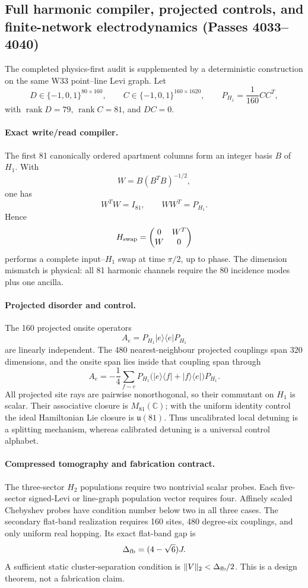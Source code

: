 \subsection{Full harmonic compiler, projected controls, and finite-network electrodynamics (Passes 4033--4040)}
\label{sec:pass4033-4040-physics-continuation}

The completed physics-first audit is supplemented by a deterministic construction on the same W33 point--line Levi graph.  Let
\[
D\in\{-1,0,1\}^{80\times160},\qquad
C\in\{-1,0,1\}^{160\times1620},\qquad
P_{H_1}=\frac1{160}CC^T,
\]
with \(\operatorname{rank}D=79\), \(\operatorname{rank}C=81\), and \(DC=0\).

\paragraph{Exact write/read compiler.}
The first 81 canonically ordered apartment columns form an integer basis \(B\) of \(H_1\).  With
\[
W=B(B^TB)^{-1/2},
\]
one has
\[
W^TW=I_{81},\qquad WW^T=P_{H_1}.
\]
Hence
\[
H_{\rm swap}=\begin{pmatrix}0&W^T\\W&0\end{pmatrix}
\]
performs a complete input--\(H_1\) swap at time \(\pi/2\), up to phase.  The dimension mismatch is physical: all 81 harmonic channels require the 80 incidence modes plus one ancilla.

\paragraph{Projected disorder and control.}
The 160 projected onsite operators
\[
A_e=P_{H_1}|e\rangle\!\langle e|P_{H_1}
\]
are linearly independent.  The 480 nearest-neighbour projected couplings span 320 dimensions, and the onsite span lies inside that coupling span through
\[
A_e=-\frac14\sum_{f\sim e}P_{H_1}
\bigl(|e\rangle\!\langle f|+|f\rangle\!\langle e|\bigr)P_{H_1}.
\]
All projected site rays are pairwise nonorthogonal, so their commutant on \(H_1\) is scalar.  Their associative closure is \(M_{81}(\mathbb C)\); with the uniform identity control the ideal Hamiltonian Lie closure is \(\mathfrak u(81)\).  Thus uncalibrated local detuning is a splitting mechanism, whereas calibrated detuning is a universal control alphabet.

\paragraph{Compressed tomography and fabrication contract.}
The three-sector \(H_2\) populations require two nontrivial scalar probes.  Each five-sector signed-Levi or line-graph population vector requires four.  Affinely scaled Chebyshev probes have condition number below two in all three cases.  The secondary flat-band realization requires 160 sites, 480 degree-six couplings, and only uniform real hopping.  Its exact flat-band gap is
\[
\Delta_{\rm fb}=(4-\sqrt6)J.
\]
A sufficient static cluster-separation condition is \(\|V\|_2<\Delta_{\rm fb}/2\).  This is a design theorem, not a fabrication claim.

